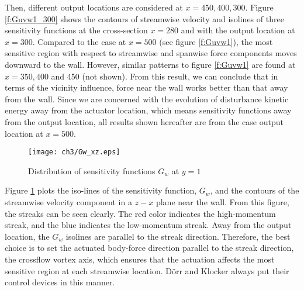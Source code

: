 Then, different output locations are considered at $x=450,400,300$. Figure \ref{f:Guvw1_300} shows the contours of streamwise velocity and isolines of three sensitivity functions at the cross-section $x=280$ and with the output location at $x=300$. Compared to the case at $x=500$ (see figure \ref{f:Guvw1}), the most sensitive region with respect to streamwise and spanwise force components moves downward to the wall. However, similar patterns to figure \ref{f:Guvw1} are found at $x=350,400$ and 450 (not shown). From this result, we can conclude that in terms of the vicinity influence, force near the wall works better than that away from the wall. Since we are concerned with the evolution of disturbance kinetic energy away from the actuator location, which means sensitivity functions away from the output location, all results shown hereafter are from the case output location at $x=500$.

\begin{figure}
  \centering
  \texttt{[image: ch3/Gw\_xz.eps]}\\
  \caption{Distribution of sensitivity functions $G_w$ at $y=1$}\label{f:Gw_xz}
\end{figure}

Figure \ref{f:Gw_xz} plots the iso-lines of the sensitivity function, $G_w$, and the contours of the streamwise velocity component in a $z-x$ plane near the wall. From this figure, the streaks can be seen clearly. The red color indicates the high-momentum streak, and the blue indicates the low-momentum streak. Away from the output location, the $G_w$ isolines are parallel to the streak direction. Therefore, the best choice is to set the actuated body-force direction parallel to the streak direction, the crossflow vortex axis, which ensures that the actuation affects the most sensitive region at each streamwise location. D\"orr and Klocker \cite{dorr2015stabilisation,dorr2016} always put their control devices in this manner.

